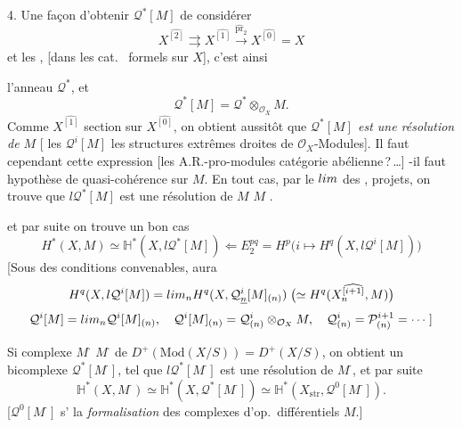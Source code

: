 \documentclass[11pt,a4paper]{article}
\begin{document}
4. Une façon  d'obtenir $\mathcal{Q}^{*}[M]$ \ill{}
de considérer
\[
  X^{\widehat{[2]}} \rightrightarrows X^{\widehat{[1]}}
  \xrightarrow{\widehat{\mathrm{pr}}_2} X^{\widehat{[0]}} = X
\]
et les  \ill{}, [dans les cat.\ \ill{} \ill{} formels sur
$X$], \struck{\ill{}} c'est ainsi


\ill{} \ill{} l'anneau  $\mathcal{Q}^{*}$, et
\[
  \mathcal{Q}^{*}[M] = \mathcal{Q}^{*} \otimes_{\mathcal{O}_X} M .
\]
Comme $X^{\widehat{[1]}}$ \ill{} \ill{} section sur $X^{\widehat{[0]}}$, on
obtient aussitôt que \emph{$\mathcal{Q}^{*}[M]$ est une résolution de $M$}
[\ill{} \ill{} \ill{} \ill{} les $\mathcal{Q}^{i}[M]$ les structures
extrêmes droites de $\mathcal{O}_X$-Modules]. Il faut \ill{} \ill{}
cependant \ill{} \ill{} \ill{} \ill{} \ill{} \ill{} \ill{} cette expression
[les A.R.-pro-modules \ill{} \ill{} catégorie abélienne\,?\,\ldots]
\ill{}-il \ill{} \ill{} \ill{} faut \ill{} \ill{} \ill{} \ill{} \ill{}
hypothèse de quasi-cohérence sur $M$. En tout cas, \struck{\ill{}}
 par \ill{} \ill{} \ill{} le \ill{} \ill{}
$\varprojlim$ des \ill{}, \ill{} \ill{} projets, on trouve que
$l\mathcal{Q}^{*}[M]$ est une résolution de $M$ \ill{} $M$ \ill{}.


et par suite on trouve un bon cas
\[
  H^{*}(X, M) \simeq \mathbb{H}^{*}(X, l\mathcal{Q}^{*}[M])
  \Longleftarrow
  E_2^{pq} = H^{p}\bigl(i \mapsto H^{q}(X, l\mathcal{Q}^{i}[M])\bigr)
\]
[Sous des conditions convenables, \ill{} aura
\[
  H^{q}(X, l\mathcal{Q}^{i}[M]) = \varprojlim_{n}
  H^{q}(X, \mathcal{Q}^{i}_{\uncertain{n}}[M]_{(n)})
  \;\bigl(\simeq H^{q}(X^{\widehat{[i+1]}}_{n}, M)\bigr)
\]
\ill{} \ill{} \ill{}
\[
  \mathcal{Q}^{i}[M] = \varprojlim_{n} \mathcal{Q}^{i}[M]_{(n)}, \quad
  \mathcal{Q}^{i}[M]_{(n)} = \mathcal{Q}^{i}_{(n)} \otimes_{\mathcal{O}_X} M, \quad
  \mathcal{Q}^{i}_{(n)} = \mathcal{P}^{i+1}_{(n)} = \cdots\;]
\]

Si \ill{} complexe $M^{\cdot}$ \ill{} \ill{} \emph{\ill{}} $M^{\cdot}$ de
\struck{\ill{}} $D^{+}(\mathrm{Mod}(X/S)) = D^{+}(X/S)$, on obtient un
bicomplexe $\mathcal{Q}^{*}[M^{\cdot}]$, tel que $l\mathcal{Q}^{*}[M^{\cdot}]$
est une résolution de $M^{\cdot}$, et par suite
\[
  \mathbb{H}^{*}(X, M^{\cdot}) \simeq \mathbb{H}^{*}(X, \mathcal{Q}^{*}[M^{\cdot}])
  \simeq \mathbb{H}^{*}(X_{\mathrm{str}}, \mathcal{Q}^{0}[M^{\cdot}]) .
\]
[$\mathcal{Q}^{0}[M^{\cdot}]$ s' la
\emph{formalisation} des complexes \struck{\ill{}} d'op.\ différentiels
$M$.]
\end{document}
